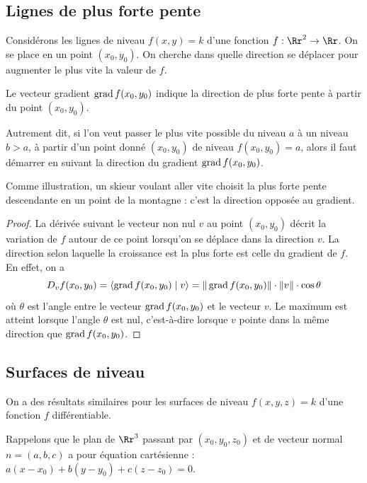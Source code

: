 \documentclass[11pt, class=report,crop=false]{standalone}
\begin{document}
\subsection{Lignes de plus forte pente}
 
Considérons les lignes de niveau $f(x,y)=k$ d'une fonction $f : \Rr^2 \to \Rr$.
On se place en un point $(x_0,y_0)$. On cherche dans quelle direction se déplacer pour augmenter le plus vite la valeur de $f$.
 
\begin{proposition}
Le vecteur gradient $\operatorname{grad} f(x_0,y_0)$ indique la direction de plus forte pente à partir du point $(x_0,y_0)$.
\end{proposition}


Autrement dit, si l'on veut passer le plus vite
possible du niveau $a$ à un niveau $b>a$, à partir d'un point donné $(x_0,y_0)$ de niveau
$f(x_0,y_0)=a$, alors il faut démarrer en suivant la direction du gradient $\operatorname{grad} f(x_0,y_0)$. 


Comme illustration, un skieur voulant aller vite choisit 
la plus forte pente descendante en un point de la montagne : c'est la direction opposée au gradient. 
 
\begin{proof}
La dérivée suivant le vecteur non nul $v$ au point $(x_0,y_0)$ décrit la variation de $f$ autour de ce point lorsqu'on se déplace dans la direction $v$. 
La direction selon laquelle la croissance est la plus forte est celle du gradient de $f$. En effet, on a 
$$D_{v}f(x_0,y_0)=\langle \operatorname{grad} f(x_0,y_0) \mid v\rangle=
\| \operatorname{grad} f(x_0,y_0) \| \cdot \| v \| \cdot \cos \theta$$
où $\theta$ est l'angle entre le vecteur $\operatorname{grad} f(x_0,y_0)$ et le vecteur $v$.
Le maximum est atteint lorsque l'angle $\theta$ est nul, c'est-à-dire lorsque $v$ pointe dans la même direction que $\operatorname{grad} f(x_0,y_0)$.
\end{proof}


\subsection{Surfaces de niveau}

On a des résultats similaires pour les surfaces de niveau $f(x,y,z)=k$ d'une fonction $f$ différentiable.

Rappelons que le plan de $\Rr^3$ passant par $(x_0,y_0,z_0)$ et de vecteur normal 
$n=(a,b,c)$ a pour équation cartésienne :
$a(x-x_0)+b(y-y_0)+c(z-z_0)=0$.
\end{document}
